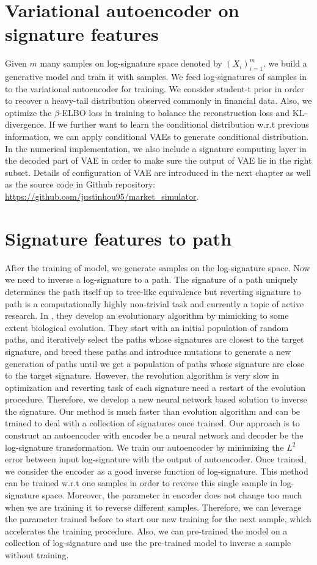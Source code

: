 \documentclass[12pt]{report}
\theoremstyle{definition}
\theoremstyle{remark}
\begin{document}
\section{Variational autoencoder on signature features}
Given $m$ many samples on log-signature space denoted by $(X_{i})_{i=1}^{m}$, we build a generative model and train it with samples. We feed log-signatures of samples in to the variational autoencoder for training. We consider student-t prior in order to recover a heavy-tail distribution observed commonly in financial data. Also, we optimize the $\beta$-ELBO loss in training to balance the reconstruction loss and KL-divergence. If we further want to learn the conditional distribution w.r.t previous information, we can apply conditional VAEs to generate conditional distribution. In the numerical implementation, we also include a signature computing layer in the decoded part of VAE in order to make sure the output of VAE lie in the right subset. Details of configuration of VAE are introduced in the next chapter as well as the source code in Github repository: \url{https://github.com/justinhou95/market_simulator}. 

\section{Signature features to path}
After the training of model, we generate samples on the log-signature space. Now we need to inverse a log-signature to a path. The signature of a path uniquely determines the path itself up to tree-like equivalence but reverting signature to path is a computationally highly non-trivial task and currently a topic of active research. In \cite{buehler2020data}, they develop an evolutionary algorithm by mimicking to some extent biological evolution. They start with an initial population of random paths, and iteratively select the paths whose signatures are closest to the target signature, and breed these paths and introduce mutations to generate a new generation of paths until we get a population of paths whose signature are close to the target signature. However, the revolution algorithm is very slow in optimization and reverting task of each signature need a restart of the evolution procedure. Therefore, we develop a new neural network based solution to inverse the signature. Our method is much faster than evolution algorithm and can be trained to deal with a collection of signatures once trained. Our approach is to construct an autoencoder with encoder be a neural network and decoder be the log-signature transformation. We train our autoencoder by minimizing the $L^{2}$ error between input log-signature with the output of autoencoder. Once trained, we consider the encoder as a good inverse function of log-signature. This method can be trained w.r.t one samples in order to reverse this single sample in log-signature space. Moreover, the parameter in encoder does not change too much when we are training it to reverse different samples. Therefore, we can leverage the parameter trained before to start our new training for the next sample, which accelerates the training procedure. Also, we can pre-trained the model on a collection of log-signature and use the pre-trained model to inverse a sample without training.  
\end{document}
